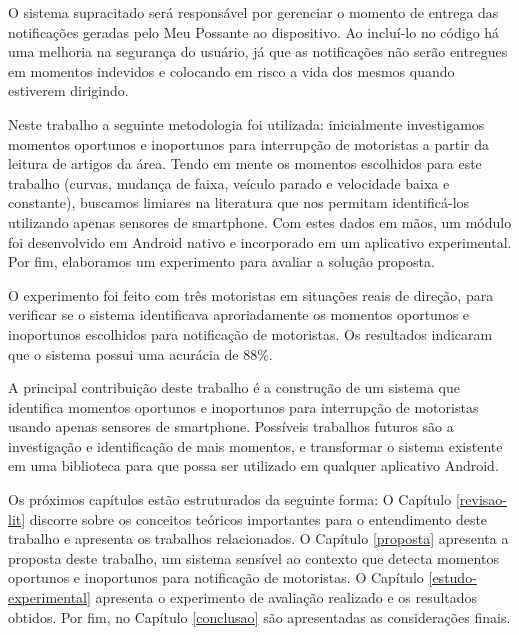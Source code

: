 O sistema supracitado será responsável por gerenciar o momento de entrega das notificações geradas pelo Meu Possante ao dispositivo. Ao
incluí-lo no código há uma melhoria na segurança do usuário, já que as notificações não serão entregues em momentos indevidos e
colocando em risco a vida dos mesmos quando estiverem dirigindo.

Neste trabalho a seguinte metodologia foi utilizada: inicialmente investigamos momentos oportunos e inoportunos para interrupção de motoristas
a partir da leitura de artigos da área. Tendo em mente os momentos escolhidos para este trabalho (curvas, mudança de faixa, veículo parado e
velocidade baixa e constante), buscamos limiares na literatura que nos permitam identificá-los utilizando apenas sensores de smartphone.
Com estes dados em mãos, um módulo foi desenvolvido em Android nativo e incorporado em um aplicativo experimental. Por fim, elaboramos um
experimento para avaliar a solução proposta.

O experimento foi feito com três motoristas em situações reais de direção, para verificar se o sistema identificava aproriadamente os momentos
oportunos e inoportunos escolhidos para notificação de motoristas. Os resultados indicaram que o sistema possui uma acurácia de 88\%.

A principal contribuição deste trabalho é a construção de um sistema que identifica momentos oportunos e inoportunos para interrupção de motoristas
usando apenas sensores de smartphone. Possíveis trabalhos futuros são a investigação e identificação de mais momentos, e transformar o sistema
existente em uma biblioteca para que possa ser utilizado em qualquer aplicativo Android.

Os próximos capítulos estão estruturados da seguinte forma: O Capítulo \ref{revisao-lit} discorre sobre os conceitos teóricos importantes para o
entendimento deste trabalho e apresenta os trabalhos relacionados. O Capítulo \ref{proposta} apresenta a proposta deste trabalho, um sistema
sensível ao contexto que detecta momentos oportunos e inoportunos para notificação de motoristas. O Capítulo \ref{estudo-experimental}
apresenta o experimento de avaliação realizado e os resultados obtidos. Por fim, no Capítulo \ref{conclusao} são apresentadas as considerações finais.
